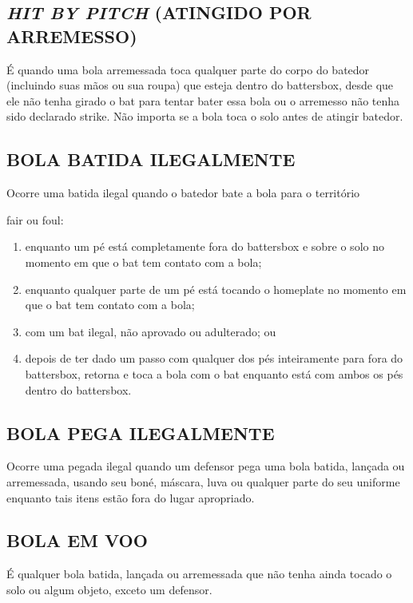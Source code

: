 \subsection{\textit{HIT BY PITCH} (ATINGIDO POR ARREMESSO)}

 É quando uma bola arremessada toca qualquer parte do corpo do batedor (incluindo suas mãos ou sua roupa) que esteja dentro do \gls{battersbox}, desde que ele não tenha girado o \gls{bat} para tentar bater essa bola ou o arremesso não tenha sido declarado \gls{strike}. Não importa se a bola toca o solo antes de atingir batedor.

\subsection{BOLA BATIDA ILEGALMENTE}
 Ocorre uma batida ilegal quando o batedor bate a bola para o território

\gls{fair} ou \gls{foul}:
\begin{enumerate}[label=(\alph*)]
	\item   enquanto um pé está completamente fora do \gls{battersbox} e sobre o solo no momento em que o \gls{bat} tem contato com a bola;
	\item  enquanto qualquer parte de um pé está tocando o \gls{homeplate} no momento em que o \gls{bat} tem contato com a bola;
	\item  com um \gls{bat} ilegal, não aprovado ou adulterado; ou
	\item  depois de ter dado um passo com qualquer dos pés inteiramente para fora do \gls{battersbox}, retorna e toca a bola com o \gls{bat} enquanto está com ambos os pés dentro do \gls{battersbox}.
\end{enumerate}

\subsection{BOLA PEGA ILEGALMENTE}

 Ocorre uma pegada ilegal quando um defensor pega uma bola batida, lançada ou arremessada, usando seu boné, máscara, luva ou qualquer parte do seu uniforme enquanto tais itens estão fora do lugar apropriado.

\subsection{BOLA EM VOO}

É qualquer bola batida, lançada ou arremessada que não tenha ainda tocado o solo ou algum objeto, exceto um defensor.

